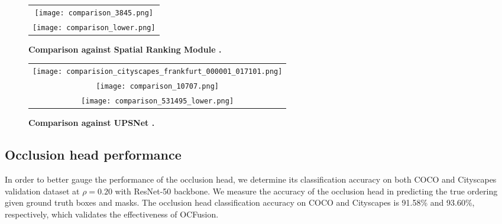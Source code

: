 \documentclass[10pt,twocolumn,letterpaper]{article}
\begin{document}
\begin{figure*}[!htp]
\vspace{-0mm}
\begin{center}
\begin{tabular} {c}
\hspace{-5mm} \texttt{[image: comparison\_3845.png]} \\
\hspace{-5mm} \texttt{[image: comparison\_lower.png]}
\end{tabular}
\end{center}
\vspace{-6mm}
\caption{\textbf{Comparison against Spatial Ranking Module \cite{liu2019end}.}}
\vspace{5mm}
\label{fig:figure_ComparisonEndToEnd}
\end{figure*}

\begin{figure*}[!h]

\vspace{0mm}
\begin{center}
\begin{tabular} {c}
\hspace{-5mm} \texttt{[image: comparision\_cityscapes\_frankfurt\_000001\_017101.png]} \\
\hspace{-5mm} \texttt{[image: comparison\_10707.png]} \\
\hspace{-5mm} \texttt{[image: comparison\_531495\_lower.png]}
\end{tabular}
\end{center}
\vspace{-6mm}
\caption{\textbf{Comparison against UPSNet \cite{xiong2019upsnet}.}}
\vspace{0mm}
\label{fig:figure_ComparisonUPSNet}
\end{figure*}


\subsection{Occlusion head performance}
In order to better gauge the performance of the occlusion head, we determine its classification accuracy on both COCO and Cityscapes validation dataset at $\rho = 0.20$ with ResNet-50 backbone. We measure the accuracy of the occlusion head in predicting the true ordering given ground truth boxes and masks. The occlusion head classification accuracy on COCO and Cityscapes is 91.58\% and 93.60\%, respectively, which validates the effectiveness of OCFusion.
\end{document}
